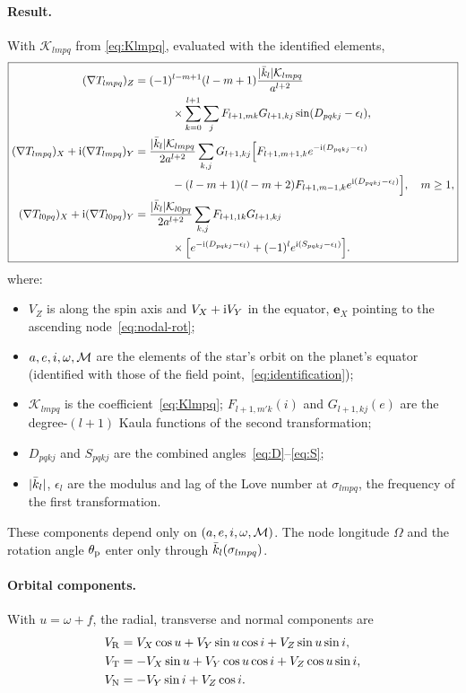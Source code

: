 \paragraph{Result.} With $\mathcal K_{lmpq}$ from \eqref{eq:Klmpq}, evaluated with the identified elements,
\begin{equation}
  \boxed{\begin{aligned}
  (\nabla T_{lmpq})_Z={}&(-1)^{l-m+1}(l-m+1)\frac{|\bar k_l|\mathcal K_{lmpq}}{a^{l+2}}\\
  &\qquad\times\sum_{k=0}^{l+1}\sum_jF_{l+1,mk}G_{l+1,kj}\sin(D_{pqkj}-\epsilon_l),\\
  (\nabla T_{lmpq})_X+\mathrm{i}(\nabla T_{lmpq})_Y={}&\frac{|\bar k_l|\mathcal K_{lmpq}}{2a^{l+2}}\sum_{k,j}G_{l+1,kj}\Big[F_{l+1,m+1,k}e^{-\mathrm{i}(D_{pqkj}-\epsilon_l)}\\
  &\qquad-(l-m+1)(l-m+2)F_{l+1,m-1,k}e^{\mathrm{i}(D_{pqkj}-\epsilon_l)}\Big],\quad m\ge1,\\
  (\nabla T_{l0pq})_X+\mathrm{i}(\nabla T_{l0pq})_Y={}&\frac{|\bar k_l|\mathcal K_{l0pq}}{2a^{l+2}}\sum_{k,j}F_{l+1,1k}G_{l+1,kj}\\
  &\qquad\times\Big[e^{-\mathrm{i}(D_{pqkj}-\epsilon_l)}+(-1)^le^{\mathrm{i}(S_{pqkj}-\epsilon_l)}\Big].
  \end{aligned}} \label{eq:grad-node}
\end{equation}
where:
\begin{itemize}
  \item $V_Z$ is along the spin axis and $V_X+\mathrm{i} V_Y$ in the equator, $\mathbf e_X$ pointing to the ascending node~\eqref{eq:nodal-rot};
  \item $a,e,i,\omega,\mathcal{M}$ are the elements of the star's orbit on the planet's equator (identified with those of the field point,~\eqref{eq:identification});
  \item $\mathcal K_{lmpq}$ is the coefficient~\eqref{eq:Klmpq}; $F_{l+1,m'k}(i)$ and $G_{l+1,kj}(e)$ are the degree-$(l+1)$ Kaula functions of the second transformation;
  \item $D_{pqkj}$ and $S_{pqkj}$ are the combined angles~\eqref{eq:D}--\eqref{eq:S};
  \item $|\bar k_l|$, $\epsilon_l$ are the modulus and lag of the Love number at $\sigma_{lmpq}$, the frequency of the first transformation.
\end{itemize}
These components depend only on $(a,e,i,\omega,\mathcal{M})$. The node longitude $\Omega$ and the rotation angle $\theta_{\mathrm p}$ enter only through $\bar k_l(\sigma_{lmpq})$.

\paragraph{Orbital components.} With $u=\omega+f$, the radial, transverse and normal components are
\begin{equation}
  \begin{aligned}
  V_{\rm R}&=V_X\cos u+V_Y\sin u\cos i+V_Z\sin u\sin i,\\
  V_{\rm T}&=-V_X\sin u+V_Y\cos u\cos i+V_Z\cos u\sin i,\\
  V_{\rm N}&=-V_Y\sin i+V_Z\cos i.
  \end{aligned} \label{eq:RTN}
\end{equation}

